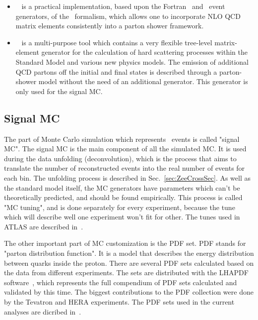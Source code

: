 \begin{itemize}
\item \Mcatnlo~\cite{lib:MC_mcatnlo} is a practical implementation, based upon the Fortran \Herwig\ and \Herwigpp\ event generators, of the \Mcatnlo\ formalism, which allows one to incorporate NLO QCD matrix elements consistently into a parton shower framework.

\item \Sherpa~\cite{lib:MC_sherpa1, lib:MC_sherpa2} is a multi-purpose tool which contains a very flexible tree-level matrix-element generator for the calculation of hard scattering processes within the Standard Model and various new physics models.  The emission of additional QCD partons off  the  initial  and  final  states  is  described through a parton-shower model without the need of an additional generator. This generator is only used for the signal MC.
\end{itemize}

\subsection{Signal MC}

The part of Monte Carlo simulation which represents \Zee\ events is called "signal MC". The signal MC is the main component of all the simulated MC. It is used during the data unfolding (deconvolution), which is the process that aims to translate the number of reconstructed events into the real number of events for each bin. The unfolding process is described in Sec.~\ref{sec:ZeeCrossSec}. As well as the standard model itself, the MC generators have parameters which can't be theoretically predicted, and should be found empirically. This process is called "MC tuning", and is done separately for every experiment, because the tune which will describe well one experiment won't fit for other. The tunes used in ATLAS are described in~\cite{lib:MC_tune1, lib:MC_tune2}.

The other important part of MC customization is the PDF set. PDF stands for "parton distribution function". It is a model that describes the energy distribution between quarks inside the proton. There are several PDF sets calculated based on the data from different experiments. The sets are distributed with the LHAPDF software~\cite{lib:lhapdf}, which represents the full compendium of PDF sets calculated and validated by this time. The biggest contributions to the PDF collection were done by the Tevatron and HERA experiments. The PDF sets used in the current analyses are dicribed in~\cite{lib:MC_pdfct10, lib:MC_pdfcteq6l1}.

